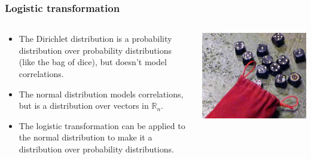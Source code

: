 \begin{frame}
  \frametitle{Logistic transformation}
  \begin{columns}
    \begin{column}{0.65\textwidth}
      \begin{center}
        \begin{itemize}
          \item The Dirichlet distribution is a probability distribution over probability distributions
                (like the bag of dice), but doesn't model correlations.

          \item The normal distribution models correlations, but is a distribution over vectors in $\mathbb{R}_n$.

          \item The logistic transformation can be applied to the normal distribution
                to make it a distribution over probability distributions.
        \end{itemize}
      \end{center}
    \end{column}

    \begin{column}{0.35\textwidth}
      \begin{center}
        \includegraphics[width=\textwidth]{img/dice2-cropped.jpg}


\end{center}
\end{column}
\end{columns}
\end{frame}
